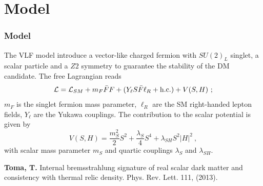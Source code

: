 \documentclass{beamer}
\begin{document}
\section{Model}
\begin{frame}
\frametitle{Model}
\begin{justify}

The VLF model introduce a vector-like charged fermion with $SU(2)_L$ singlet, a scalar particle and a $Z2$ symmetry to guarantee the stability of the DM candidate. The free Lagrangian reads
\begin{equation}\nonumber
\mathcal{L} = \mathcal{L}_{SM} +  m_F \bar{F}F + ( Y_\ell S \bar{F}\ell_R + {\rm h.c.} ) + V(S,H)~;
\end{equation}\label{EQ}
$m_F$ is the singlet fermion mass parameter, $\ell_R$ are the SM right-handed lepton fields, $Y_\ell$ 
are the Yukawa couplings. The contribution to the scalar potential is given by
\begin{equation}\nonumber
V(S,H) = \frac{m_S^2}{2} S^2 + \frac{\lambda_S}{4} S^4 + \lambda_{SH} S^2|H|^2 ~,
\end{equation}
with scalar mass parameter $m_S$ and quartic couplings $\lambda_{S}$ and $\lambda_{SH}$.
\end{justify}

\begin{spacing}{0.5}
	{\tiny\textbf{Toma, T.} Internal bremsstrahlung signature of real scalar dark matter and consistency with thermal relic density. Phys. Rev. Lett. 111, (2013).}
	\vspace{4 mm}
\end{spacing}


\end{frame}
\end{document}
